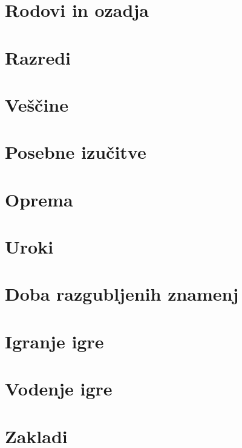 \documentclass[10pt,a4paper,twocolumn,openany]{book}
\begin{document}
\newcommand{\oneaction}{♦}
\newcommand{\twoactions}{♦♦}
\newcommand{\threeactions}{♦♦♦}
\newcommand{\freeaction}{◇}
\newcommand{\reaction}{↺}

\frontmatter

\rpgMakeCover[
    image = img/cover,
    logo = img/logo,
    title = Stezosledec\\\Huge{Druga izdaja},
    subtitle = Osnovna pravila igre Pathfinder 2e
]



\tableofcontents



\chapter{Rodovi in ozadja}



\chapter{Razredi}



\chapter{Veščine}



\chapter{Posebne izučitve}



\chapter{Oprema}



\chapter{Uroki}



\chapter{Doba razgubljenih znamenj}



\chapter{Igranje igre}



\chapter{Vodenje igre}



\chapter{Zakladi}


\end{document}
